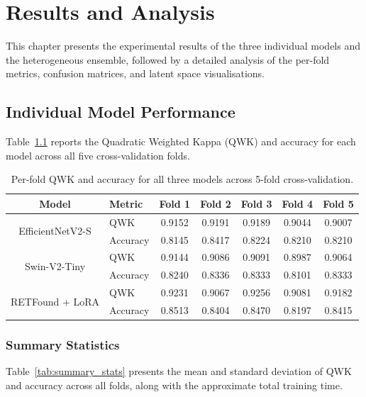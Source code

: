 \chapter{Results and Analysis}
\label{ch:results}

This chapter presents the experimental results of the three individual models and the heterogeneous ensemble, followed by a detailed analysis of the per-fold metrics, confusion matrices, and latent space visualisations.

\section{Individual Model Performance}
\label{sec:individual_results}

Table~\ref{tab:per_fold_qwk} reports the Quadratic Weighted Kappa (QWK) and accuracy for each model across all five cross-validation folds.

\begin{table}[htbp]
\centering
\caption{Per-fold QWK and accuracy for all three models across 5-fold cross-validation.}
\label{tab:per_fold_qwk}
\begin{tabular}{clccccc}
\toprule
\textbf{Model} & \textbf{Metric} & \textbf{Fold 1} & \textbf{Fold 2} & \textbf{Fold 3} & \textbf{Fold 4} & \textbf{Fold 5} \\
\midrule
\multirow{2}{*}{EfficientNetV2-S}
  & QWK      & 0.9152 & 0.9191 & 0.9189 & 0.9044 & 0.9007 \\
  & Accuracy & 0.8145 & 0.8417 & 0.8224 & 0.8210 & 0.8210 \\
\midrule
\multirow{2}{*}{Swin-V2-Tiny}
  & QWK      & 0.9144 & 0.9086 & 0.9091 & 0.8987 & 0.9064 \\
  & Accuracy & 0.8240 & 0.8336 & 0.8333 & 0.8101 & 0.8333 \\
\midrule
\multirow{2}{*}{RETFound + LoRA}
  & QWK      & 0.9231 & 0.9067 & 0.9256 & 0.9081 & 0.9182 \\
  & Accuracy & 0.8513 & 0.8404 & 0.8470 & 0.8197 & 0.8415 \\
\bottomrule
\end{tabular}
\end{table}

\subsection{Summary Statistics}

Table~\ref{tab:summary_stats} presents the mean and standard deviation of QWK and accuracy across all folds, along with the approximate total training time.

